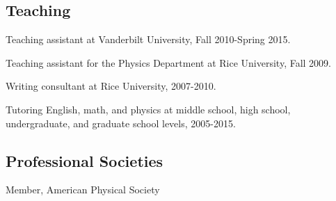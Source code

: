 \documentclass[letterpaper]{article}
\renewenvironment{itemize}{
\begin{list}{}{
\setlength{\leftmargin}{1.5em}
}
}{
\end{list}
}
\begin{document}
\subsection*{Teaching}
\begin{itemize}
\item Teaching assistant at Vanderbilt University, Fall 2010-Spring 2015.
\item Teaching assistant for the Physics Department at Rice University, Fall 2009.
\item Writing consultant at Rice University, 2007-2010.
\item Tutoring English, math, and physics at middle school, high school, undergraduate, and graduate school levels, 2005-2015.
\end{itemize}

\subsection*{Professional Societies}
\begin{itemize}
\item Member, American Physical Society
\end{itemize}
\end{document}
